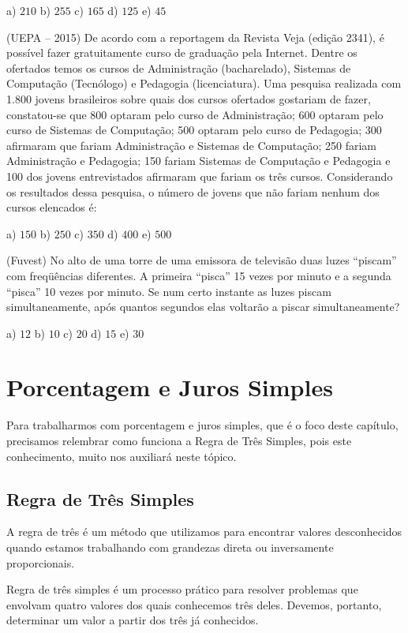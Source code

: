 \begin{multicols*}{2}
	a) $210 $ b) $255 $ c) $165 $ d) $125 $ e) $45 $

	\execnum (UEPA  --  2015) De acordo com a reportagem da Revista Veja (edição 2341), é possível fazer gratuitamente curso de graduação pela Internet. Dentre os ofertados temos os cursos de Administração (bacharelado), Sistemas de Computação (Tecnólogo) e Pedagogia (licenciatura). Uma pesquisa realizada com 1.800 jovens brasileiros sobre quais dos cursos ofertados gostariam de fazer, constatou-se que 800 optaram pelo curso de Administração; 600 optaram pelo curso de Sistemas de Computação; 500 optaram pelo curso de Pedagogia; 300 afirmaram que fariam Administração e Sistemas de Computação; 250 fariam Administração e Pedagogia; 150 fariam Sistemas de Computação e Pedagogia e 100 dos jovens entrevistados afirmaram que fariam os três cursos. Considerando os resultados dessa pesquisa, o número de jovens que não fariam nenhum dos cursos elencados é:

	a) $150 $ b) $250 $ c) $350 $ d) $400 $ e) $500 $

	\execnum (Fuvest) No alto de uma torre de uma emissora de televisão duas luzes “piscam” com freqüências diferentes. A primeira “pisca” 15 vezes por minuto e a segunda “pisca” 10 vezes por minuto. Se num certo instante as luzes piscam simultaneamente, após quantos segundos elas voltarão a piscar simultaneamente?

	a) $12 $ b) $10 $ c) $20 $ d) $15 $ e) $30 $


	
	\pagebreak
	\section*{Porcentagem e Juros Simples}

	Para trabalharmos com porcentagem e juros simples, que é o foco deste capítulo, precisamos relembrar como funciona a Regra de Três Simples, pois este conhecimento, muito nos auxiliará neste tópico.

	\subsection*{Regra de Três Simples}

	A regra de três é um método que utilizamos para encontrar valores desconhecidos quando estamos trabalhando com grandezas direta ou inversamente proporcionais.

	Regra de três simples é um processo prático para resolver problemas que envolvam quatro valores dos quais conhecemos três deles. Devemos, portanto, determinar um valor a partir dos três já conhecidos.


\end{multicols*}
